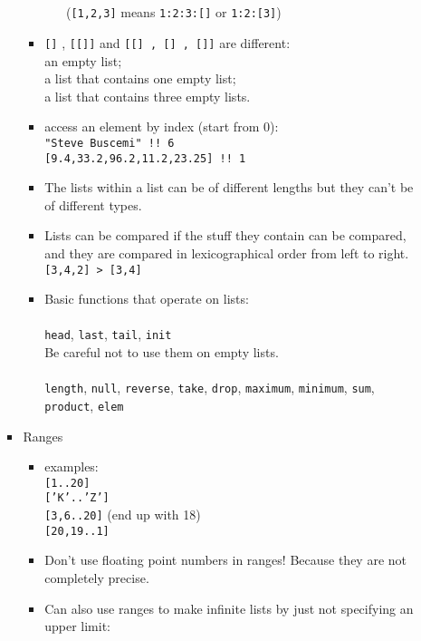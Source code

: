 \documentclass[a4paper,10pt]{article}
\begin{document}
\begin{enumerate}
\begin{enumerate}
\begin{itemize}
\begin{itemize}
\begin{itemize}
    \\\\(\texttt{[1,2,3]} means \texttt{1:2:3:[]} or \texttt{1:2:[3]})\\
   \end{itemize}
   \item \texttt{[]} , \texttt{[[]]} and \texttt{[[] , [] , []]} are different:
   \\an empty list;
   \\a list that contains one empty list;
   \\a list that contains three empty lists.
   \item access an element by index (start from 0):
   \\\texttt{"Steve Buscemi" !! 6}
   \\\texttt{[9.4,33.2,96.2,11.2,23.25] !! 1}
   \item The lists within a list can be of different lengths but they can't be of different types. 
   \item Lists can be compared if the stuff they contain can be compared, and they are compared in lexicographical order from left to right.
   \\\texttt{[3,4,2] > [3,4]}
   \item Basic functions that operate on lists:
   \\\\\texttt{head}, \texttt{last}, \texttt{tail}, \texttt{init}
   \\Be careful not to use them on empty lists. 
   \\\\\texttt{length}, \texttt{null}, \texttt{reverse}, \texttt{take}, \texttt{drop}, \texttt{maximum}, \texttt{minimum}, \texttt{sum}, \texttt{product}, \texttt{elem}\\
  \end{itemize}
  \item Ranges
  \begin{itemize}
   \item examples:
   \\\texttt{[1..20]}
   \\\texttt{['K'..'Z']}
   \\\texttt{[3,6..20]} (end up with 18)
   \\\texttt{[20,19..1]}
   \item Don't use floating point numbers in ranges! Because they are not completely precise.
   \item Can also use ranges to make infinite lists by just not specifying an upper limit:

\end{itemize}
\end{itemize}
\end{enumerate}
\end{enumerate}
\end{document}
